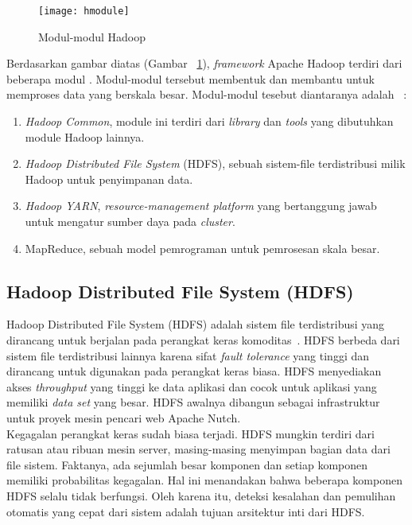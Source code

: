 \begin{figure}[H]
    \centering  
    \texttt{[image: hmodule]}  
    \caption[Modul-modul Hadoop ]{Modul-modul Hadoop} 
    \label{fig:hmodule} 
\end{figure}

Berdasarkan gambar diatas (Gambar ~\ref{fig:hmodule}), {\it framework} Apache Hadoop terdiri dari beberapa modul . Modul-modul tersebut membentuk dan membantu untuk memproses data yang berskala besar. Modul-modul tesebut diantaranya adalah ~\cite{tomwhite:05:htdg}:

\begin{enumerate}
\item \textit{Hadoop Common}, module ini terdiri dari {\it library} dan {\it tools} yang dibutuhkan module Hadoop lainnya.

\item \textit{Hadoop Distributed File System} (HDFS), sebuah sistem-file terdistribusi milik Hadoop untuk penyimpanan data.

\item \textit{Hadoop YARN}, {\it resource-management platform} yang bertanggung jawab untuk mengatur sumber daya pada {\it cluster}.

\item MapReduce, sebuah model pemrograman untuk pemrosesan skala besar.

\end{enumerate}

\subsection{Hadoop Distributed File System (HDFS)}

Hadoop Distributed File System (HDFS) adalah sistem file terdistribusi yang dirancang untuk berjalan pada perangkat keras komoditas~\cite{tomwhite:05:htdg}. HDFS berbeda dari sistem file terdistribusi lainnya  karena sifat {\it fault tolerance} yang tinggi dan dirancang untuk digunakan pada perangkat keras biasa. HDFS menyediakan akses \textit{throughput} yang tinggi ke data aplikasi dan cocok untuk aplikasi yang memiliki \textit{data set} yang besar. HDFS awalnya dibangun sebagai infrastruktur untuk proyek mesin pencari web Apache Nutch.\\

Kegagalan perangkat keras sudah biasa terjadi. HDFS mungkin terdiri dari ratusan atau ribuan mesin server, masing-masing menyimpan bagian data dari file sistem. Faktanya, ada sejumlah besar komponen dan setiap komponen memiliki probabilitas kegagalan. Hal ini  menandakan bahwa beberapa komponen HDFS selalu tidak berfungsi. Oleh karena itu, deteksi kesalahan dan pemulihan otomatis yang cepat dari sistem adalah tujuan arsitektur inti dari HDFS.\\

